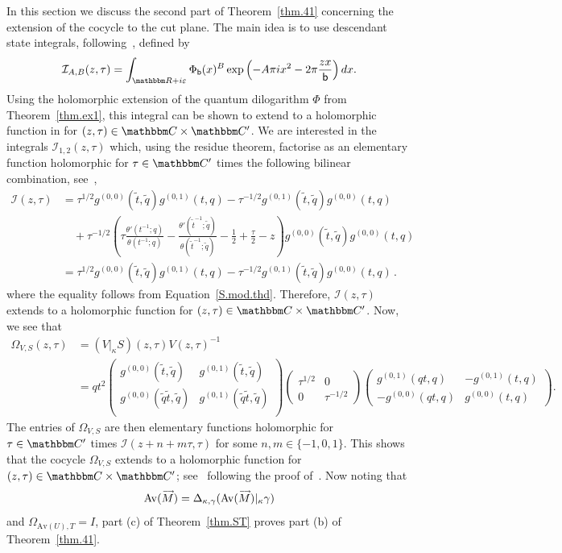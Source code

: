 \documentclass[12pt,reqno]{amsart}
\theoremstyle{definition}
\def\BR{\mathbbm R}
\def\BC{\mathbbm C}
\def\calI{\mathcal I}
\def\tq{\tilde{q}}
\def\ve{\varepsilon}
\def\be{\begin{equation}}
\def\ee{\end{equation}}
\def\sfb{\mathsf{b}}
\def\e{\bold e}
\def\Av{\mathrm{Av}}
\def\Om{\Omega}
\def\vM{\accentset{\longrightarrow}{M}}
\def\sfb{\mathsf{b}}
\begin{document}
In this section we discuss the second part of Theorem~\ref{thm.41} concerning
the extension of the cocycle to the cut plane. The main idea is to use
descendant state integrals, following~\cite[Eqn.(41)]{GGM}, defined by
\be
\mathcal{I}_{A,B}(z,\tau)
=
\int_{\BR+i\ve}
\Phi_{\sfb}(x)^B
\exp\left(-A\pi i x^{2}-2\pi\frac{zx}{\sfb}\right)dx.
\ee
Using the holomorphic extension of the quantum dilogarithm $\Phi$ from
Theorem~\ref{thm.ex1}, this integral can be shown to extend to a holomorphic
function in for $(z,\tau)\in\BC\times\BC'$. We are interested in the integrals
$\mathcal{I}_{1,2}(z,\tau)$ which, using the residue theorem, factorise as an
elementary function holomorphic for $\tau\in\BC'$ times the following bilinear
combination, see~\cite[Thm.3]{GGM},
\be
\label{gs.fac.int}
\begin{aligned}
\calI(z,\tau)
&=\tau^{1/2} g^{(0,0)}(\tilde{t},\tq)g^{(0,1)}(t,q)
-\tau^{-1/2}g^{(0,1)}(\tilde{t},\tq)g^{(0,0)}(t,q)\\
&\quad+\tau^{-1/2}\left(\tau\frac{\theta'(t^{-1};q)}{\theta(t^{-1};q)}
  -\frac{\theta'(\tilde{t}^{-1};\tq)}{\theta(\tilde{t}^{-1};\tq)}
  -\frac{1}{2}+\frac{\tau}{2}-z\right)g^{(0,0)}(\tilde{t},\tq)g^{(0,0)}(t,q)\\
&=\tau^{1/2} g^{(0,0)}(\tilde{t},\tq)g^{(0,1)}(t,q)
-\tau^{-1/2} g^{(0,1)}(\tilde{t},\tq)g^{(0,0)}(t,q) \,.
\end{aligned}
\ee
where the equality follows from Equation~\eqref{S.mod.thd}. Therefore,
$\calI(z,\tau)$ extends to a holomorphic function for $(z,\tau)\in\BC\times\BC'$.
Now, we see that 
{\small
\be
\begin{aligned}
\Om_{V,S}(z,\tau)
&=
(V|_{\kappa}S)(z,\tau)V(z,\tau)^{-1}\\
&=
qt^2
\begin{pmatrix}
  g^{(0,0)}(\tilde{t},\tq) & g^{(0,1)}(\tilde{t},\tq)\\
  g^{(0,0)}(\tq\tilde{t},\tq) & g^{(0,1)}(\tq\tilde{t},\tq)\\
\end{pmatrix}
\begin{pmatrix}
  \tau^{1/2} & 0\\
  0 & \tau^{-1/2}
\end{pmatrix}
\begin{pmatrix}
  g^{(0,1)}(qt,q) & -g^{(0,1)}(t,q)\\
  -g^{(0,0)}(qt,q) & g^{(0,0)}(t,q)
\end{pmatrix}
.
\end{aligned}
\ee
}
The entries of $\Om_{V,S}$ are then elementary functions holomorphic for
$\tau\in\BC'$ times $\calI(z+n+m\tau,\tau)$ for some $n,m\in\{-1,0,1\}$.
This shows that the cocycle $\Om_{V,S}$ extends to a holomorphic function for
$(z,\tau)\in\BC\times\BC'$; see~\cite[Thm.14]{GGM:peacock} following the proof
of~\cite[Thm.1.1]{GK:qseries}. Now noting that
\be
\Av(\vM) = \Delta_{\kappa,\gamma} (\Av(\vM)|_{\kappa} \gamma)
\ee
and $\Om_{\Av(U),T}=I$, part (c) of Theorem~\ref{thm.ST} proves part \rm{(b)}
of Theorem~\ref{thm.41}.
\end{document}
